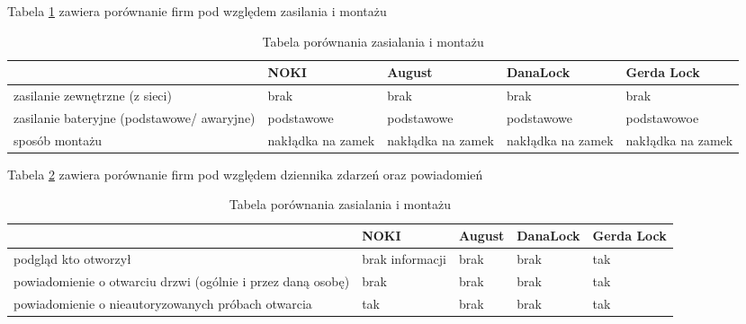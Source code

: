  
 	Tabela \ref{tab:porownanie2} zawiera porównanie firm pod względem zasilania i montażu
 \begin{longtable}[!ht]{|p{4cm}|p{}|p{}|p{}|p{}|} 
 	\caption{Tabela porównania zasialania i montażu}
 	\label{tab:porownanie2}\\
 	\hline	
 	& NOKI & August & DanaLock & Gerda Lock  \\	\hline
 	zasilanie zewnętrzne (z sieci)	
 	& brak & brak & brak & brak \\	\hline
	 zasilanie bateryjne (podstawowe/ awaryjne)	
	 & podstawowe & podstawowe & podstawowe & podstawowoe \\	\hline
 	sposób montażu	
 	& nakłądka na zamek & nakłądka na zamek & nakłądka na zamek & nakłądka na zamek \\	\hline
 \end{longtable}
 



Tabela \ref{tab:porownanie3} zawiera porównanie firm pod względem dziennika zdarzeń oraz powiadomień
\begin{longtable}[!ht]{|p{4cm}|p{}|p{}|p{}|p{}|} 
	\caption{Tabela porównania zasialania i montażu}
	\label{tab:porownanie3}\\
	\hline	
	& NOKI & August & DanaLock & Gerda Lock  \\	\hline
	podgląd kto otworzył	
	& brak informacji & brak & brak & tak \\	\hline
	
	
	powiadomienie o otwarciu drzwi (ogólnie i przez daną osobę)
	& brak & brak & brak & tak \\	\hline
	
	
	powiadomienie o nieautoryzowanych próbach otwarcia
	& tak & brak & brak & tak \\	\hline
\end{longtable}






